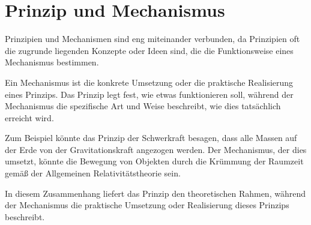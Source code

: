 \section{Prinzip und Mechanismus}\label{Appendix_Erlaeuterung_Prinzip}

Prinzipien und Mechanismen sind eng miteinander verbunden, da Prinzipien oft die zugrunde liegenden Konzepte oder Ideen sind, die die Funktionsweise eines Mechanismus bestimmen.

Ein Mechanismus ist die konkrete Umsetzung oder die praktische Realisierung eines Prinzips. Das Prinzip legt fest, wie etwas funktionieren soll, während der Mechanismus die spezifische Art und Weise beschreibt, wie dies tatsächlich erreicht wird.

Zum Beispiel könnte das Prinzip der Schwerkraft besagen, dass alle Massen auf der Erde von der Gravitationskraft angezogen werden. Der Mechanismus, der dies umsetzt, könnte die Bewegung von Objekten durch die Krümmung der Raumzeit gemäß der Allgemeinen Relativitätstheorie sein.

In diesem Zusammenhang liefert das Prinzip den theoretischen Rahmen, während der Mechanismus die praktische Umsetzung oder Realisierung dieses Prinzips beschreibt.




